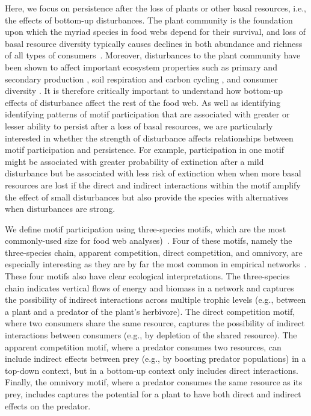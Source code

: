 \documentclass[12pt]{article}
\begin{document}
\begin{spacing}{2.0}
    
    Here, we focus on persistence after the loss of plants or other basal resources, i.e., the effects of bottom-up disturbances.
    The plant community is the foundation upon which the myriad species in food webs depend for their survival, and loss of basal resource diversity typically causes declines in both abundance and richness of all types of consumers~\citep{scherber2010bottom,Dobson2009food, Mduma1999food, Georgiadis2007}.
    Moreover, disturbances to the plant community have been shown to affect important ecosystem properties such as primary \citep{Hector1999} and secondary production \citep{borer2012plant}, soil respiration and carbon cycling \citep{chen2019plant}, and consumer diversity \citep{scherber2010bottom, Baiser2016,li2020bottom}.
    It is therefore critically important to understand how bottom-up effects of disturbance affect the rest of the food web.
    As well as identifying identifying patterns of motif participation that are associated with greater or lesser ability to persist after a loss of basal resources, we are particularly interested in whether the strength of  disturbance affects relationships between motif participation and persistence.
    For example, participation in one motif might be associated with greater probability of extinction after a mild disturbance but be associated with less risk of extinction when when more basal resources are lost if the direct and indirect interactions within the motif amplify the effect of small disturbances but also provide the species with alternatives when disturbances are strong.

    

    We define motif participation using three-species motifs, which are the most commonly-used size for food web analyses)~\citep{Milo2004,Stouffer2007,Stouffer2012,Cirtwill2015a}. 
    Four of these motifs, namely the three-species chain, apparent competition, direct competition, and omnivory, are especially interesting as they are by far the most common in empirical networks~\citep{Stouffer2007, Borrelli2015a, giling2019plant}.
    These four motifs also have clear ecological interpretations.
    The three-species chain indicates vertical flows of energy and biomass in a network and captures the possibility of indirect interactions across multiple trophic levels (e.g., between a plant and a predator of the plant's herbivore).
    The direct competition motif, where two consumers share the same resource, captures the possibility of indirect interactions between consumers (e.g., by depletion of the shared resource). 
    The apparent competition motif, where a predator consumes two resources, can include indirect effects between prey (e.g., by boosting predator populations) in a top-down context, but in a bottom-up context only includes direct interactions.
    Finally, the omnivory motif, where a predator consumes the same resource as its prey, includes captures the potential for a plant to have both direct and indirect effects on the predator. 
    

\end{spacing}
\end{document}

